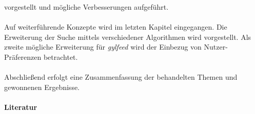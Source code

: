 \documentclass{scrartcl}
\begin{document}
vorgestellt und mögliche Verbesserungen aufgeführt.
\\
\\
Auf weiterführende Konzepte wird im letzten Kapitel eingegangen. Die Erweiterung
der Suche mittels verschiedener Algorithmen wird vorgestellt. Als zweite
mögliche Erweiterung für \textit{gylfeed} wird der Einbezug von Nutzer-Präferenzen
betrachtet.
\\
\\
Abschließend erfolgt eine Zusammenfassung der behandelten Themen und gewonnenen
Ergebnisse.
\\
\\
\vspace*{-2em}\large\textbf{Literatur}
\renewcommand*{\refname}{} 
\vspace*{-1em}
\small


\end{document}
